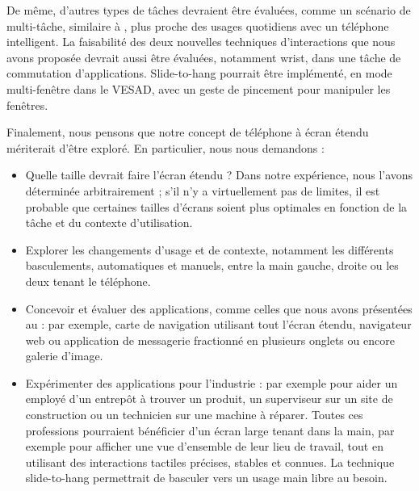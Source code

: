 
De même, d'autres types de tâches devraient être évaluées, comme un scénario de multi-tâche, similaire à \cite{Ens2014}, plus proche des usages quotidiens avec un téléphone intelligent. La faisabilité des deux nouvelles techniques d'interactions que nous avons proposée devrait aussi être évaluées, notamment wrist, dans une tâche de commutation d'applications. Slide-to-hang pourrait être implémenté, en mode multi-fenêtre dans le VESAD, avec un geste de pincement  pour manipuler les fenêtres.

Finalement, nous pensons que notre concept de téléphone à écran étendu mériterait d'être exploré. En particulier, nous nous demandons :
\begin{itemize}
  \item Quelle taille devrait faire l'écran étendu ? Dans notre expérience, nous l'avons déterminée arbitrairement ; s'il n'y a virtuellement pas de limites, il est probable que certaines tailles d'écrans soient plus optimales en fonction de la tâche et du contexte d'utilisation.
  \item Explorer les changements d'usage et de contexte, notamment les différents basculements, automatiques et manuels, entre la main gauche, droite ou les deux tenant le téléphone.
  \item Concevoir et évaluer des applications, comme celles que nous avons présentées au \cite{ch:concept} : par exemple, carte de navigation utilisant tout l'écran étendu, navigateur web ou application de messagerie fractionné en plusieurs onglets ou encore galerie d'image.
  \item Expérimenter des applications pour l'industrie : par exemple pour aider un employé d'un entrepôt à trouver un produit, un superviseur sur un site de construction ou un technicien sur une machine à réparer. Toutes ces professions pourraient bénéficier d'un écran large tenant dans la main, par exemple pour afficher une vue d'ensemble de leur lieu de travail, tout en utilisant des interactions tactiles précises, stables et connues. La technique slide-to-hang permettrait de basculer vers un usage main libre au besoin.
\end{itemize}